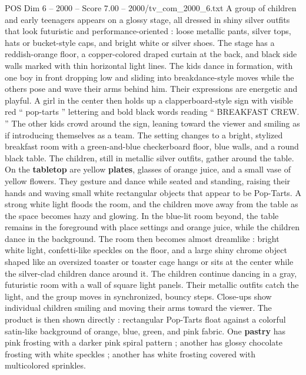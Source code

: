 \begin{textsample}{POS Dim 6 – 2000 – Score 7.00 – 2000/tv\_com\_2000\_6.txt}  \label{ex:f6_pos_058}
A group of children and early teenagers appears on a glossy stage, all dressed in shiny silver outfits that look futuristic and performance-oriented : loose metallic pants, silver tops, hats or bucket-style caps, and bright white or silver shoes.
The stage has a reddish-orange floor, a copper-colored draped curtain at the back, and black side walls marked with thin horizontal light lines.
The kids dance in formation, with one boy in front dropping low and sliding into breakdance-style moves while the others pose and wave their arms behind him.
Their expressions are energetic and playful.
A girl in the center then holds up a clapperboard-style sign with visible red “ pop-tarts ” lettering and bold black words reading “ BREAKFAST CREW. ” The other kids crowd around the sign, leaning toward the viewer and smiling as if introducing themselves as a team.
The setting changes to a bright, stylized breakfast room with a green-and-blue checkerboard floor, blue walls, and a round black table.
The children, still in metallic silver outfits, gather around the table.
On the \textbf{tabletop} are yellow \textbf{plates}, glasses of orange juice, and a small vase of yellow flowers.
They gesture and dance while seated and standing, raising their hands and waving small white rectangular objects that appear to be Pop-Tarts.
A strong white light floods the room, and the children move away from the table as the space becomes hazy and glowing.
In the blue-lit room beyond, the table remains in the foreground with place settings and orange juice, while the children dance in the background.
The room then becomes almost dreamlike : bright white light, confetti-like speckles on the floor, and a large shiny chrome object shaped like an oversized toaster or toaster cage hangs or sits at the center while the silver-clad children dance around it.
The children continue dancing in a gray, futuristic room with a wall of square light panels.
Their metallic outfits catch the light, and the group moves in synchronized, bouncy steps.
Close-ups show individual children smiling and moving their arms toward the viewer.
The product is then shown directly : rectangular Pop-Tarts float against a colorful satin-like background of orange, blue, green, and pink fabric.
One \textbf{pastry} has pink frosting with a darker pink spiral pattern ; another has glossy chocolate frosting with white speckles ; another has white frosting covered with multicolored sprinkles.

\end{textsample}
